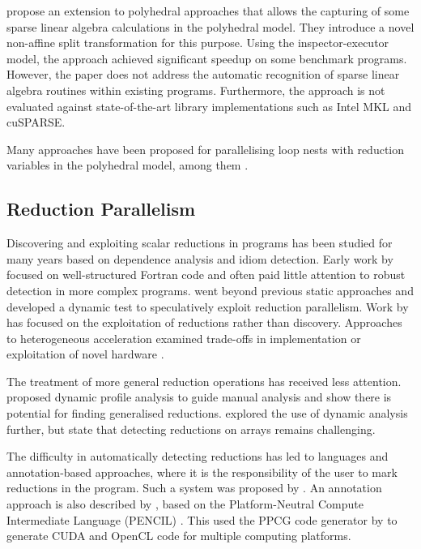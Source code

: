     \citet{Zhang:2016:CTG:3018843.3018849} propose an extension to polyhedral
    approaches that allows the capturing of some sparse linear algebra
    calculations in the polyhedral model.
    They introduce a novel non-affine split transformation for this purpose.
    Using the inspector-executor model, the approach achieved significant
    speedup on some benchmark programs.
    However, the paper does not address the automatic recognition of sparse
    linear algebra routines within existing programs.
    Furthermore, the approach is not evaluated against state-of-the-art
    library implementations such as Intel MKL and cuSPARSE.

    Many approaches have been proposed for parallelising loop nests with
    reduction variables in the polyhedral model, among them
    \citet{jouvelot1989unified,redon1994scheduling,chi1997optimizing,
    gupta2006simplifying,stock2014framework}.

\subsection{Reduction Parallelism}

    Discovering and exploiting scalar reductions in programs has been studied
    for many years based on dependence analysis and idiom detection.
    Early work by
    \citet{pottenger1995idiom,suganuma1996detection,fisher1994parallelizing}
    focused on well-structured Fortran code and often paid little attention to
    robust detection in more complex programs.
    \citet{rauchwerger1999lrpd} went beyond previous static approaches and
    developed a dynamic test to speculatively exploit reduction parallelism.
    Work by
    \citet{Gutierrez:2000,gutierrez2003optimization,gutierrez2008analytical}
    has focused on the exploitation of reductions rather than discovery.
    Approaches to heterogeneous acceleration examined trade-offs in
    implementation \citep{yu2006adaptive} or exploitation of novel hardware
    \citep{ravi2010compiler,Huo2011HiPC}.

    The treatment of more general reduction operations has received less
    attention.
    \citet{das2010experiences} proposed dynamic profile analysis to guide
    manual analysis and show there is potential for finding generalised
    reductions.
    \citet{kim2012dynamic} explored the use of dynamic analysis further,
    but state that detecting reductions on arrays remains challenging.

    The difficulty in automatically detecting reductions has led to languages
    and annotation-based approaches, where it is the responsibility of the user
    to mark reductions in the program.
    Such a system was proposed by \citet{deitz2002high}.
    An annotation approach is also described by \citet{Reddy2016Reduction},
    based on the Platform-Neutral Compute Intermediate Language (PENCIL)
    \citep{baghdadi2015PENCIL}.
    This used the PPCG code generator by
    \citet{Verdoolaege:2013:PPC:2400682.2400713} to generate CUDA and OpenCL
    code for multiple computing platforms.

